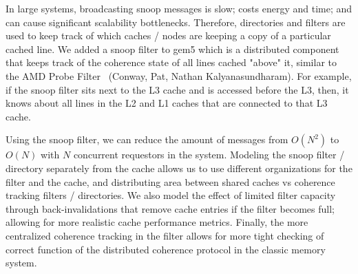 In large systems, broadcasting snoop messages is slow; costs energy and time; and can cause significant scalability bottlenecks.
Therefore, directories and filters are used to keep track of which caches / nodes are keeping a copy of a particular cached line.
We added a snoop filter to gem5 which is a distributed component that keeps track of the coherence state of all lines cached "above" it, similar to the AMD Probe Filter~\cite{} (Conway, Pat, Nathan Kalyanasundharam).
For example, if the snoop filter sits next to the L3 cache and is accessed before the L3, then, it knows about all lines in the L2 and L1 caches that are connected to that L3 cache.

Using the snoop filter, we can reduce the amount of messages from $O(N^2)$ to $O(N)$ with $N$ concurrent requestors in the system.
Modeling the snoop filter / directory separately from the cache allows us to use different organizations for the filter and the cache, and distributing area between shared caches vs coherence tracking filters / directories.
We also model the effect of limited filter capacity through back-invalidations that remove cache entries if the filter becomes full; allowing for more realistic cache performance metrics.
Finally, the more centralized coherence tracking in the filter allows for more tight checking of correct function of the distributed coherence protocol in the classic memory system.

